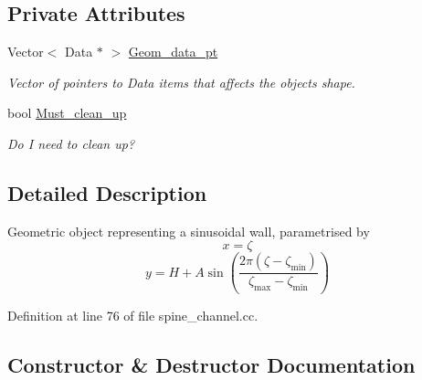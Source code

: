 \subsection*{Private Attributes}
\begin{DoxyCompactItemize}
\item 
Vector$<$ Data $\ast$ $>$ \hyperlink{classSinusoidalWall_a1d8226424f058dff0234e65a6e288a39}{Geom\+\_\+data\+\_\+pt}
\begin{DoxyCompactList}\small\item\em Vector of pointers to Data items that affects the object\textquotesingle{}s shape. \end{DoxyCompactList}\item 
bool \hyperlink{classSinusoidalWall_ad89b819030680f489135376a8abc9f05}{Must\+\_\+clean\+\_\+up}
\begin{DoxyCompactList}\small\item\em Do I need to clean up? \end{DoxyCompactList}\end{DoxyCompactItemize}


\subsection{Detailed Description}
Geometric object representing a sinusoidal wall, parametrised by \[ x = \zeta \] \[ y = H + A \sin\left(\frac{2\pi \left(\zeta-\zeta_{\mbox{min}}\right)} {\zeta_{\mbox{max}}-\zeta_{\mbox{min}}} \right)\] 

Definition at line 76 of file spine\+\_\+channel.\+cc.



\subsection{Constructor \& Destructor Documentation}
\mbox{\label{classSinusoidalWall_a6179a8823d039fc3b090db1cfce30a36}} 
